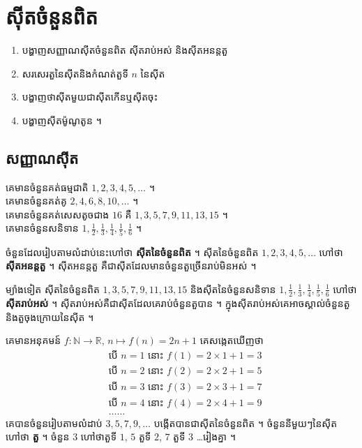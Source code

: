 \chapter{ស៊ីតចំនួនពិត}

\begin{objBox}[វត្ថុបំណង]
\begin{enumerate}[1]
  \item បង្ហាញសញ្ញាណស៊ីតចំនួនពិត ស៊ីតរាប់អស់ និងស៊ីតអនន្តតួ
  \item សរសេរតួនៃស៊ីតនិងកំណត់តួទី $n$ នៃស៊ីត
  \item បង្ហាញថាស៊ីតមួយជាស៊ីតកើនឬស៊ីតចុះ
  \item បង្ហាញស៊ីតម៉ូណូតូន ។
\end{enumerate}
\end{objBox}

\section{សញ្ញាណស៊ីត}

\begin{example}[ឧទាហរណ៍ ១]
គេមានចំនួនគត់ធម្មជាតិ $1, 2, 3, 4, 5, \ldots$ ។\\
គេមានចំនួនគត់គូ $2, 4, 6, 8, 10, \ldots$ ។\\
គេមានចំនួនគត់សេសតូចជាង $16$ គឺ $1, 3, 5, 7, 9, 11, 13, 15$ ។\\
គេមានចំនួនសនិទាន $1, \frac{1}{2}, \frac{1}{3}, \frac{1}{4}, \frac{1}{5}, \frac{1}{6}$ ។
\end{example}

ចំនួនដែលរៀបតាមលំដាប់នេះហៅថា \textbf{ស៊ីតនៃចំនួនពិត} ។ ស៊ីតនៃចំនួនពិត $1, 2, 3, 4, 5, \ldots$ ហៅថា \textbf{ស៊ីតអនន្តតួ} ។ ស៊ីតអនន្តតួ គឺជាស៊ីតដែលមានចំនួនតួច្រើនរាប់មិនអស់ ។

ម្យ៉ាងទៀត ស៊ីតនៃចំនួនពិត $1, 3, 5, 7, 9, 11, 13, 15$ និងស៊ីតនៃចំនួនសនិទាន $1, \frac{1}{2}, \frac{1}{3}, \frac{1}{4}, \frac{1}{5}, \frac{1}{6}$ ហៅថា \textbf{ស៊ីតរាប់អស់} ។ ស៊ីតរាប់អស់គឺជាស៊ីតដែលគេរាប់ចំនួនតួបាន ។ ក្នុងស៊ីតរាប់អស់គេអាចស្គាល់ចំនួនតួនិងតួចុងក្រោយនៃស៊ីត ។

\begin{example}[ឧទាហរណ៍ ២]
គេមានអនុគមន៍ $f : \mathbb{N} \to \mathbb{R}$, $n \mapsto f(n) = 2n + 1$ គេសង្កេតឃើញថា
\[
\begin{aligned}
&\text{បើ } n = 1 \text{ នោះ } f(1) = 2 \times 1 + 1 = 3\\
&\text{បើ } n = 2 \text{ នោះ } f(2) = 2 \times 2 + 1 = 5\\
&\text{បើ } n = 3 \text{ នោះ } f(3) = 2 \times 3 + 1 = 7\\
&\text{បើ } n = 4 \text{ នោះ } f(4) = 2 \times 4 + 1 = 9\\
&\ldots\ldots
\end{aligned}
\]
គេបានចំនួនរៀបតាមលំដាប់ $3, 5, 7, 9, \ldots$ បង្កើតបានជាស៊ីតនៃចំនួនពិត ។ ចំនួននីមួយៗនៃស៊ីតហៅថា \textbf{តួ} ។ ចំនួន $3$ ហៅថាតួទី $1$, $5$ តួទី $2$, $7$ តួទី $3$ \ldots រៀងគ្នា ។
\end{example}

